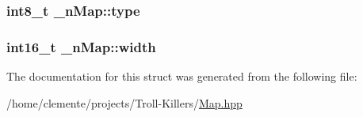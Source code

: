 \subsubsection[{type}]{\setlength{\rightskip}{0pt plus 5cm}int8\+\_\+t \+\_\+n\+Map\+::type}\label{struct__n_map_a79dda563cc2d4f715a9185f1a970150b}
\hypertarget{struct__n_map_a4e83d0ff1af678de2d5b318e549d0ec5}{}
\subsubsection[{width}]{\setlength{\rightskip}{0pt plus 5cm}int16\+\_\+t \+\_\+n\+Map\+::width}\label{struct__n_map_a4e83d0ff1af678de2d5b318e549d0ec5}


The documentation for this struct was generated from the following file\+:\begin{DoxyCompactItemize}
\item 
/home/clemente/projects/\+Troll-\/\+Killers/\hyperlink{_map_8hpp}{Map.\+hpp}\end{DoxyCompactItemize}
